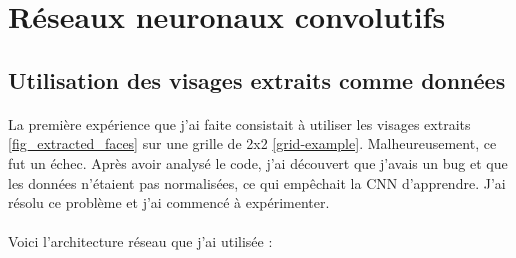 

\section{Réseaux neuronaux convolutifs}
\subsection{Utilisation des visages extraits comme données}
\paragraph{}
La première expérience que j'ai faite consistait à utiliser les visages extraits \ref{fig_extracted_faces} sur une grille de 2x2 \ref{grid-example}.
Malheureusement, ce fut un échec.
Après avoir analysé le code, j'ai découvert que j'avais un bug et que les données n'étaient pas normalisées, ce qui empêchait la CNN d'apprendre.
J'ai résolu ce problème et j'ai commencé à expérimenter.

\paragraph{}
Voici l'architecture réseau que j'ai utilisée :

